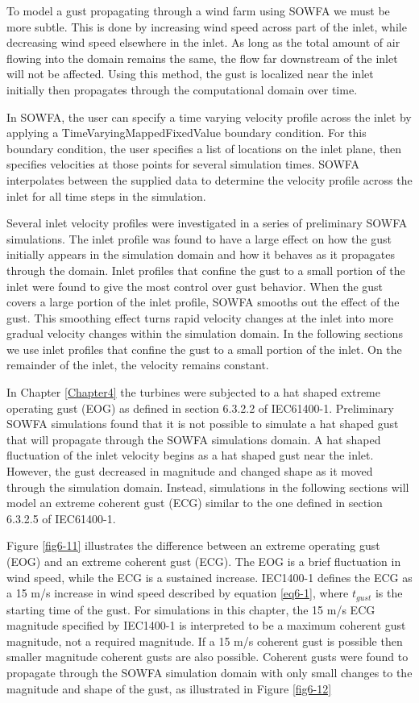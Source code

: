 To model a gust propagating through a wind farm using SOWFA we must be more subtle. This is done by increasing wind speed across part of the inlet, while decreasing wind speed elsewhere in the inlet. As long as the total amount of air flowing into the domain remains the same, the flow far downstream of the inlet will not be affected. Using this method, the gust is localized near the inlet initially then propagates through the computational domain over time. 

In SOWFA, the user can specify a time varying velocity profile across the inlet by applying a TimeVaryingMappedFixedValue boundary condition. For this boundary condition, the user specifies a list of locations on the inlet plane, then specifies velocities at those points for several simulation times. SOWFA interpolates between the supplied data to determine the velocity profile across the inlet for all time steps in the simulation.

Several inlet velocity profiles were investigated in a series of preliminary SOWFA simulations. The inlet profile was found to have a large effect on how the gust initially appears in the simulation domain and how it behaves as it propagates through the domain. Inlet profiles that confine the gust to a small portion of the inlet were found to give the most control over gust behavior. When the gust covers a large portion of the inlet profile, SOWFA smooths out the effect of the gust. This smoothing effect turns rapid velocity changes at the inlet into more gradual velocity changes within the simulation domain. In the following sections we use inlet profiles that confine the gust to a small portion of the inlet. On the remainder of the inlet, the velocity remains constant. 

In Chapter \ref{Chapter4} the turbines were subjected to a hat shaped extreme operating gust (EOG) as defined in section 6.3.2.2 of IEC61400-1.\cite{IEC2005} Preliminary SOWFA simulations found that it is not possible to simulate a hat shaped gust that will propagate through the SOWFA simulations domain. A hat shaped fluctuation of the inlet velocity begins as a hat shaped gust near the inlet. However, the gust decreased in magnitude and changed shape as it moved through the simulation domain. Instead, simulations in the following sections will model an extreme coherent gust (ECG) similar to the one defined in section 6.3.2.5 of IEC61400-1. 

Figure \ref{fig6-11} illustrates the difference between an extreme operating gust (EOG) and an extreme coherent gust (ECG). The EOG is a brief fluctuation in wind speed, while the ECG is a sustained increase. IEC1400-1 defines the ECG as a 15 m/s increase in wind speed described by equation \ref{eq6-1}, where $t_{gust}$ is the starting time of the gust. For simulations in this chapter, the 15 m/s ECG magnitude specified by IEC1400-1 is interpreted to be a maximum coherent gust magnitude, not a required magnitude. If a 15 m/s coherent gust is possible then smaller magnitude coherent gusts are also possible. Coherent gusts were found to propagate through the SOWFA simulation domain with only small changes to the magnitude and shape of the gust, as illustrated in Figure \ref{fig6-12}



